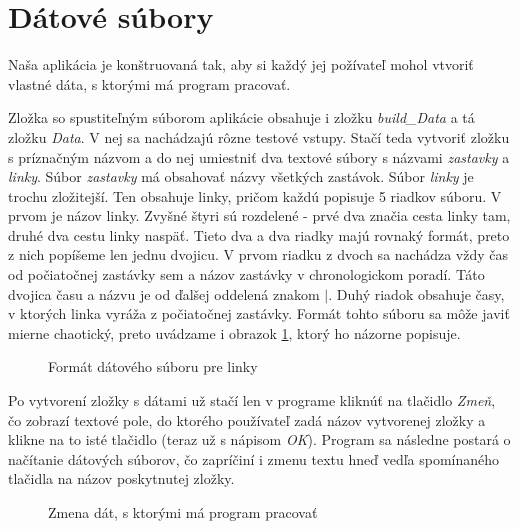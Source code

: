 \section{Dátové súbory}

Naša aplikácia je konštruovaná tak, aby si každý jej požívateľ mohol vtvoriť vlastné dáta, s ktorými má program pracovať.\newline

Zložka so spustiteľným súborom aplikácie obsahuje i zložku \textit{build\_Data} a tá zložku \textit{Data}. V nej sa nachádzajú rôzne testové vstupy. Stačí teda vytvoriť zložku s príznačným názvom a do nej umiestniť dva textové súbory s názvami \textit{zastavky} a \textit{linky}. Súbor \textit{zastavky} má obsahovať názvy všetkých zastávok. Súbor \textit{linky} je trochu zložitejší. Ten obsahuje linky, pričom každú popisuje 5 riadkov súboru. V prvom je názov linky. Zvyšné štyri sú rozdelené - prvé dva značia cesta linky tam, druhé dva cestu linky naspäť. Tieto dva a dva riadky majú rovnaký formát, preto z nich popíšeme len jednu dvojicu. V prvom riadku z dvoch sa nachádza vždy čas od počiatočnej zastávky sem a názov zastávky v chronologickom poradí. Táto dvojica času a názvu je od ďalšej oddelená znakom $|$. Duhý riadok obsahuje časy, v ktorých linka vyráža z počiatočnej zastávky. Formát tohto súboru sa môže javiť mierne chaotický, preto uvádzame i obrazok \ref{Format_datoveho_suboru1}, ktorý ho názorne popisuje.\newline

\begin{figure}[H]
  \caption{Formát dátového súboru pre linky}
  \label{Format_datoveho_suboru1}
\end{figure}

Po vytvorení zložky s dátami už stačí len v programe kliknúť na tlačidlo \textit{Zmeň}, čo zobrazí textové pole, do ktorého používateľ zadá názov vytvorenej zložky a klikne na to isté tlačidlo (teraz už s nápisom \textit{OK}). Program sa následne postará o načítanie dátových súborov, čo zapríčiní i zmenu textu hneď vedľa spomínaného tlačidla na názov poskytnutej zložky.\newline

\begin{figure}[H]
  \caption{Zmena dát, s ktorými má program pracovať}
  \label{ukazka_programu3}
\end{figure}
